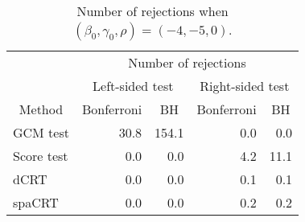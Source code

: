 \begin{table}[!h]
\centering
\caption{\label{tab:simulation_rejection_beta_-4_gamma_-5}Number of rejections when $(\beta_0,\gamma_0,\rho) = (-4, -5, 0)$.}
\centering
\begin{tabular}[t]{lrrrr}
\toprule
\multicolumn{1}{c}{ } & \multicolumn{4}{c}{Number of rejections} \\
\cmidrule(l{3pt}r{3pt}){2-5}
\multicolumn{1}{c}{ } & \multicolumn{2}{c}{Left-sided test} & \multicolumn{2}{c}{Right-sided test} \\
\cmidrule(l{3pt}r{3pt}){2-3} \cmidrule(l{3pt}r{3pt}){4-5}
\multicolumn{1}{c}{Method} & \multicolumn{1}{c}{Bonferroni} & \multicolumn{1}{c}{BH} & \multicolumn{1}{c}{Bonferroni} & \multicolumn{1}{c}{BH} \\
\cmidrule(l{3pt}r{3pt}){1-1} \cmidrule(l{3pt}r{3pt}){2-2} \cmidrule(l{3pt}r{3pt}){3-3} \cmidrule(l{3pt}r{3pt}){4-4} \cmidrule(l{3pt}r{3pt}){5-5}
GCM test & 30.8 & 154.1 & 0.0 & 0.0\\
Score test & 0.0 & 0.0 & 4.2 & 11.1\\
dCRT & 0.0 & 0.0 & 0.1 & 0.1\\
spaCRT & 0.0 & 0.0 & 0.2 & 0.2\\
\bottomrule
\end{tabular}
\end{table}
